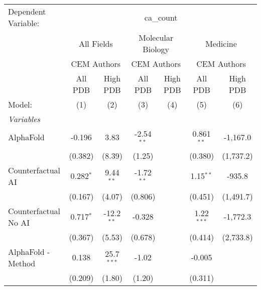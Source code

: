 \begingroup
\centering
\begin{tabular}{lcccccc}
   \tabularnewline \midrule \midrule
   Dependent Variable: & \multicolumn{6}{c}{ca\_count}\\
 & \multicolumn{2}{c}{All Fields} & \multicolumn{2}{c}{Molecular Biology} & \multicolumn{2}{c}{Medicine} \\
\cmidrule(lr){2-3} \cmidrule(lr){4-5} \cmidrule(lr){6-7}
 & \multicolumn{2}{c}{CEM Authors} & \multicolumn{2}{c}{CEM Authors} & \multicolumn{2}{c}{CEM Authors} \\
\cmidrule(lr){2-3} \cmidrule(lr){4-5} \cmidrule(lr){6-7}
 & \multicolumn{1}{c}{All PDB} & \multicolumn{1}{c}{High PDB} & \multicolumn{1}{c}{All PDB} & \multicolumn{1}{c}{High PDB} & \multicolumn{1}{c}{All PDB} & \multicolumn{1}{c}{High PDB} \\
\cmidrule(lr){2-2} \cmidrule(lr){3-3} \cmidrule(lr){4-4} \cmidrule(lr){5-5} \cmidrule(lr){6-6} \cmidrule(lr){7-7}
   Model:                                                     & (1)         & (2)          & (3)           & (4)   & (5)           & (6)\\  
   \midrule
   \emph{Variables}\\
   AlphaFold                                                  & -0.196      & 3.83         & -2.54$^{**}$  &       & 0.861$^{**}$  & -1,167.0\\   
                                                              & (0.382)     & (8.39)       & (1.25)        &       & (0.380)       & (1,737.2)\\   
   Counterfactual AI                                          & 0.282$^{*}$ & 9.44$^{**}$  & -1.72$^{**}$  &       & 1.15$^{**}$   & -935.8\\   
                                                              & (0.167)     & (4.07)       & (0.806)       &       & (0.451)       & (1,491.7)\\   
   Counterfactual No AI                                       & 0.717$^{*}$ & -12.2$^{**}$ & -0.328        &       & 1.22$^{***}$  & -1,772.3\\   
                                                              & (0.367)     & (5.53)       & (0.678)       &       & (0.414)       & (2,733.8)\\   
   AlphaFold - Method                                         & 0.138       & 25.7$^{***}$ & -1.02         &       & -0.005        &   \\   
                                                              & (0.209)     & (1.80)       & (1.20)        &       & (0.311)       &   \\   

\end{tabular}
